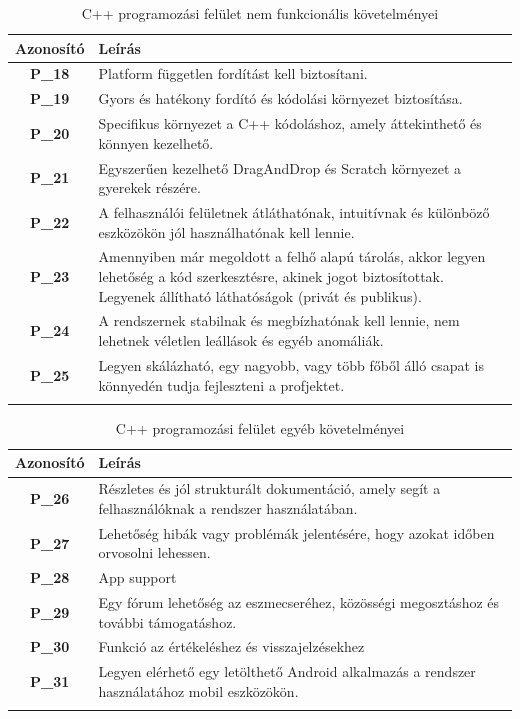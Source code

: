 \documentclass{article}
\begin{document}
\begingroup
\centering
\begin{longtable}{|c|p{14cm}|}
\hline
\textbf{Azonosító} & \textbf{Leírás}        \\ 
\hline
       \textbf{P\_18}  &  Platform független fordítást kell biztosítani. \\\hline
       \textbf{P\_19}  &  Gyors és hatékony fordító és kódolási környezet biztosítása. \\\hline
       \textbf{P\_20}  &  Specifikus környezet a C++ kódoláshoz, amely áttekinthető és könnyen kezelhető. \\\hline
       \textbf{P\_21}  &  Egyszerűen kezelhető DragAndDrop és Scratch környezet a gyerekek részére. \\\hline
       \textbf{P\_22}  &  A felhasználói felületnek átláthatónak, intuitívnak és különböző eszközökön jól használhatónak kell lennie. \\\hline
       \textbf{P\_23}  &  Amennyiben már megoldott a felhő alapú tárolás, akkor legyen lehetőség a kód szerkesztésre, akinek jogot biztosítottak. Legyenek állítható láthatóságok (privát és publikus).  \\\hline
       \textbf{P\_24}  &  A rendszernek stabilnak és megbízhatónak kell lennie, nem lehetnek véletlen leállások és egyéb anomáliák.  \\\hline
       \textbf{P\_25}  &  Legyen skálázható, egy nagyobb, vagy több főből álló csapat is könnyedén tudja fejleszteni a profjektet. \\\hline
\hline
\caption{C++ programozási felület nem funkcionális követelményei}
\end{longtable}
\endgroup

\begingroup
\centering
\begin{longtable}{|c|p{14cm}|}
\hline
\textbf{Azonosító} & \textbf{Leírás}        \\ 
\hline
       \textbf{P\_26}  &  Részletes és jól strukturált dokumentáció, amely segít a felhasználóknak a rendszer használatában. \\\hline
       \textbf{P\_27}  &  Lehetőség hibák vagy problémák jelentésére, hogy azokat időben orvosolni lehessen. \\\hline
       \textbf{P\_28}  &  App support \\\hline
       \textbf{P\_29}  &  Egy fórum lehetőség az eszmecseréhez, közösségi megosztáshoz és további támogatáshoz. \\\hline
       \textbf{P\_30}  &  Funkció az értékeléshez és visszajelzésekhez  \\\hline
       \textbf{P\_31}  &  Legyen elérhető egy letölthető Android alkalmazás a rendszer használatához mobil eszközökön. \\\hline
\hline
\caption{C++ programozási felület egyéb követelményei}
\end{longtable}
\endgroup
\end{document}
